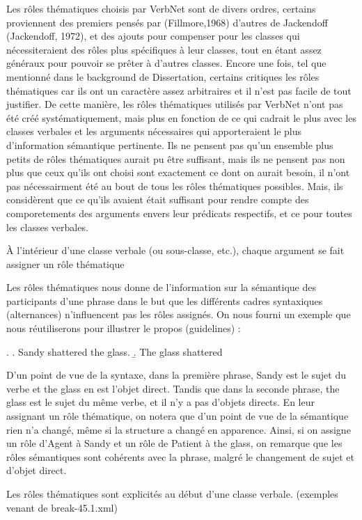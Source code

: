 Les rôles thématiques choisis par VerbNet sont de divers ordres, certains proviennent des premiers pensés par (Fillmore,1968) d'autres de Jackendoff (Jackendoff, 1972), et des ajouts pour compenser pour les classes qui nécessiteraient des rôles plus spécifiques à leur classes, tout en étant assez généraux pour pouvoir se prêter à d'autres classes. Encore une fois, tel que mentionné dans le background de Dissertation, certains critiques les rôles thématiques car ils ont un caractère assez arbitraires et il n'est pas facile de tout justifier. De cette manière, les rôles thématiques utilisés par VerbNet n'ont pas été créé systématiquement, mais plus en fonction de ce qui cadrait le plus avec les classes verbales et les arguments nécessaires qui apporteraient le plus d'information sémantique pertinente. Ils ne pensent pas qu'un ensemble plus petits de rôles thématiques aurait pu être suffisant, mais ils ne pensent pas non plus que ceux qu'ils ont choisi sont exactement ce dont on aurait besoin, il n'ont pas nécessairment été au bout de tous les rôles thématiques possibles. Mais, ils considèrent que ce qu'ils avaient était suffisant pour rendre compte des comporetements des arguments envers leur prédicats respectifs, et ce pour toutes les classes verbales.

À l'intérieur d'une classe verbale (ou sous-classe, etc.), chaque argument se fait assigner un rôle thématique

Les rôles thématiques nous donne de l'information sur la sémantique des participants d'une phrase dans le but que les différents cadres syntaxiques (alternances) n'influencent pas les rôles assignés. On nous fourni un exemple que nous réutiliserons pour illustrer le propos (guidelines) :

\ex. \label{semantic roles}
	\a. Sandy shattered the glass.
	\b. The glass shattered

D'un point de vue de la syntaxe, dans la première phrase, Sandy est le sujet du verbe et the glass en est l'objet direct. Tandis que dans la seconde phrase, the glass est le sujet du même verbe, et il n'y a pas d'objets directs. En leur assignant un rôle thématique, on notera que d'un point de vue de la sémantique rien n'a changé, même si la structure a changé en apparence. Ainsi, si on assigne un rôle d'Agent à Sandy et un rôle de Patient à the glass, on remarque que les rôles sémantiques sont cohérents avec la phrase, malgré le changement de sujet et d'objet direct.

Les rôles thématiques sont explicités au début d'une classe verbale. (exemples venant de break-45.1.xml) 

